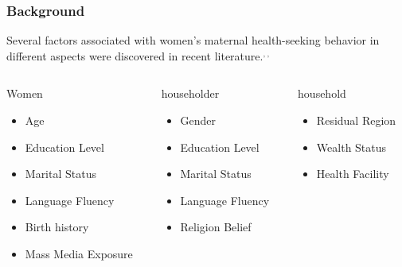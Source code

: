 \documentclass[13pt]{beamer}
\begin{document}
\begin{frame}
	\frametitle{Background}
 Several factors associated with women's maternal health-seeking behavior in different aspects were discovered in  recent literature.$^{,\hspace{2pt}}$$^{,\hspace{2pt}}$
			\begin{columns}
			\begin{column}{0.3\textwidth}
			\begin{block}{Women}
				\begin{minipage}[c][0.45\textheight][c]{\linewidth}
				\begin{itemize}
				\item  Age 
				\item Education Level
				\item Marital Status
				\item Language Fluency
				\item Birth history
				\item Mass Media Exposure
				\end{itemize}
			\end{minipage}
			\end{block}
			\end{column}
			\begin{column}{0.3\textwidth}
			\begin{exampleblock}{householder}
				\begin{minipage}[c][0.45\textheight][c]{\linewidth}
				\begin{itemize}
					\item Gender
					\item Education Level
					\item Marital Status
					\item Language Fluency
					\item Religion Belief
				\end{itemize}
			\end{minipage}
			\end{exampleblock}
			\end{column}
			\begin{column}{0.3\textwidth}
			\begin{alertblock}{household}
				\begin{minipage}[c][0.45\textheight][c]{\linewidth}
				\begin{itemize}
				\item Residual Region
				\item Wealth Status
				\item Health Facility
				\end{itemize}
			\end{minipage}
			\end{alertblock}
			\end{column}			
		\end{columns}
\end{frame}
\end{document}
